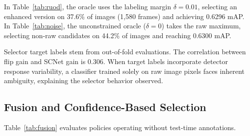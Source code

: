 \documentclass[runningheads]{llncs}
\begin{document}
In Table~\ref{tab:ruod}, the oracle uses the labeling margin $\delta = 0.01$, selecting an enhanced version on 37.6\% of images (1{,}580 frames) and achieving 0.6296 mAP. In Table~\ref{tab:noise}, the unconstrained oracle ($\delta = 0$) takes the raw maximum, selecting non-raw candidates on 44.2\% of images and reaching 0.6300 mAP.

Selector target labels stem from out-of-fold evaluations. The correlation between flip gain and SCNet gain is 0.306. When target labels incorporate detector response variability, a classifier trained solely on raw image pixels faces inherent ambiguity, explaining the selector behavior observed.

\subsection{Fusion and Confidence-Based Selection}
\label{sec:res-fusion}

Table~\ref{tab:fusion} evaluates policies operating without test-time annotations.

\begin{table}[t]
    \centering
    \caption{Multi-view fusion and confidence selection on RUOD test set.}
    \label{tab:fusion}
\end{table}
\end{document}
